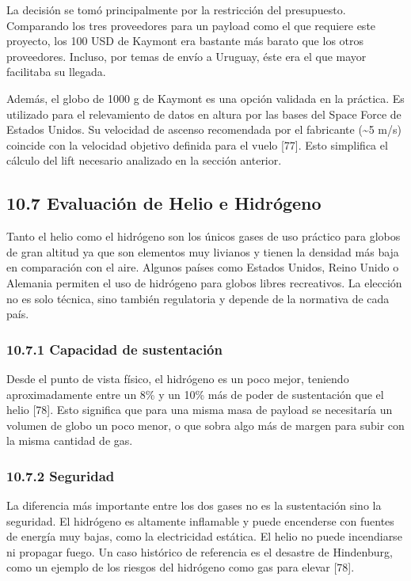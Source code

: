 \documentclass[12pt,a4paper]{article}
\begin{document}
La decisión se tomó principalmente por la restricción del presupuesto. Comparando los tres proveedores para un payload como el que requiere este proyecto, los 100 USD de Kaymont era bastante más barato que los otros proveedores. Incluso, por temas de envío a Uruguay, éste era el que mayor facilitaba su llegada.

Además, el globo de 1000 g de Kaymont es una opción validada en la práctica. Es utilizado para el relevamiento de datos en altura por las bases del Space Force de Estados Unidos. Su velocidad de ascenso recomendada por el fabricante (\textasciitilde5 m/s) coincide con la velocidad objetivo definida para el vuelo {[}77{]}. Esto simplifica el cálculo del lift necesario analizado en la sección anterior.

\subsection{10.7 Evaluación de Helio e Hidrógeno}\label{evaluaciuxf3n-de-helio-e-hidruxf3geno}

Tanto el helio como el hidrógeno son los únicos gases de uso práctico para globos de gran altitud ya que son elementos muy livianos y tienen la densidad más baja en comparación con el aire. Algunos países como Estados Unidos, Reino Unido o Alemania permiten el uso de hidrógeno para globos libres recreativos. La elección no es solo técnica, sino también regulatoria y depende de la normativa de cada país.

\subsubsection{\texorpdfstring{\textbf{10.7.1 Capacidad de sustentación}}{10.7.1 Capacidad de sustentación}}\label{capacidad-de-sustentaciuxf3n}

Desde el punto de vista físico, el hidrógeno es un poco mejor, teniendo aproximadamente entre un 8\% y un 10\% más de poder de sustentación que el helio {[}78{]}. Esto significa que para una misma masa de payload se necesitaría un volumen de globo un poco menor, o que sobra algo más de margen para subir con la misma cantidad de gas.

\subsubsection{\texorpdfstring{\textbf{10.7.2 Seguridad}}{10.7.2 Seguridad}}\label{seguridad}

La diferencia más importante entre los dos gases no es la sustentación sino la seguridad. El hidrógeno es altamente inflamable y puede encenderse con fuentes de energía muy bajas, como la electricidad estática. El helio no puede incendiarse ni propagar fuego. Un caso histórico de referencia es el desastre de Hindenburg, como un ejemplo de los riesgos del hidrógeno como gas para elevar {[}78{]}.
\end{document}
